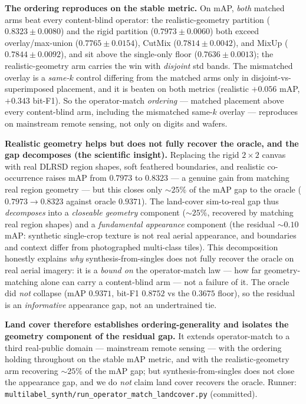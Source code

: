 \documentclass[11pt]{article}
\begin{document}
\textbf{The ordering reproduces on the stable metric.} On mAP, \emph{both} matched arms beat
every content-blind operator: the realistic-geometry partition ($0.8323 \pm 0.0080$) and the
rigid partition ($0.7973 \pm 0.0060$) both exceed overlay/max-union ($0.7765 \pm 0.0154$),
CutMix ($0.7814 \pm 0.0042$), and MixUp ($0.7844 \pm 0.0092$), and sit above the single-only
floor ($0.7636 \pm 0.0013$); the realistic-geometry arm carries the win with \emph{disjoint}
std bands. The mismatched overlay is a \emph{same-$k$} control differing from the matched
arms only in disjoint-vs-superimposed placement, and it is beaten on both metrics
(realistic $+0.056$ mAP, $+0.343$ bit-F1). So the operator-match \emph{ordering} --- matched
placement above every content-blind arm, including the mismatched same-$k$ overlay ---
reproduces on mainstream remote sensing, not only on digits and wafers.

\textbf{Realistic geometry helps but does not fully recover the oracle, and the gap
decomposes (the scientific insight).} Replacing the rigid $2\times2$ canvas with real DLRSD
region shapes, soft feathered boundaries, and realistic co-occurrence raises mAP from
$0.7973$ to $0.8323$ --- a genuine gain from matching real region geometry --- but this
closes only ${\sim}25\%$ of the mAP gap to the oracle ($0.7973 \to 0.8323$ against oracle
$0.9371$). The land-cover sim-to-real gap thus \emph{decomposes} into a \emph{closeable
geometry} component (${\sim}25\%$, recovered by matching real region shapes) and a
\emph{fundamental appearance} component (the residual ${\sim}0.10$ mAP: synthetic
single-crop texture is not real aerial appearance, and boundaries and context differ from
photographed multi-class tiles). This decomposition honestly explains \emph{why}
synthesis-from-singles does not fully recover the oracle on real aerial imagery: it is a
\emph{bound on} the operator-match law --- how far geometry-matching alone can carry a
content-blind arm --- not a failure of it. The oracle did \emph{not} collapse (mAP $0.9371$,
bit-F1 $0.8752$ vs the $0.3675$ floor), so the residual is an \emph{informative} appearance
gap, not an undertrained tie.

\textbf{Land cover therefore establishes ordering-generality and isolates the geometry
component of the residual gap.} It extends operator-match to a third real-public domain ---
mainstream remote sensing --- with the ordering holding throughout on the stable mAP metric,
and with the realistic-geometry arm recovering ${\sim}25\%$ of the mAP gap; but
synthesis-from-singles does not close the appearance gap, and we do \emph{not} claim land
cover recovers the oracle. Runner:
\texttt{multilabel\_synth/run\_operator\_match\_landcover.py} (committed).
\end{document}

